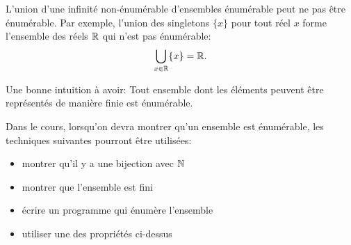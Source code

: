 L'union d'une infinité non-énumérable d'ensembles énumérable peut ne pas être énumérable.
Par exemple, l'union des singletons $\{x\}$ pour tout réel $x$ forme l'ensemble des réels $\mathbb{R}$ qui n'est pas énumérable:
\[ \bigcup_{x \in \mathbb{R}} \{x\} = \mathbb{R}. \]

\begin{myrem}
  Une bonne intuition à avoir:
  Tout ensemble dont les éléments peuvent être représentés de manière finie est énumérable.
\end{myrem}

Dans le cours, lorsqu'on devra montrer qu'un ensemble est énumérable,
les techniques suivantes pourront être utilisées:
\begin{itemize}
	\item montrer qu'il y a une bijection avec $\mathbb{N}$ 
	\item montrer que l'ensemble est fini
	\item écrire un programme qui énumère l'ensemble
	\item utiliser une des propriétés ci-dessus
\end{itemize}


